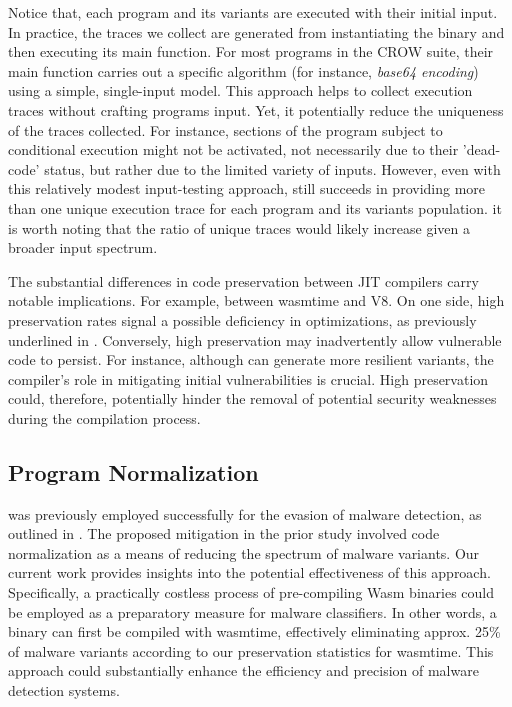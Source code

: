 Notice that, each program and its variants are executed with their initial input.
In practice, the traces we collect are generated from instantiating the \wasm binary and then executing its main function. 
For most programs in the CROW suite, their main function carries out a specific algorithm (for instance, \emph{base64 encoding}) using a simple, single-input model. 
This approach helps to collect execution traces without crafting programs input.
Yet, it potentially reduce the uniqueness of the traces collected. 
For instance, sections of the program subject to conditional execution might not be activated, not necessarily due to their 'dead-code' status, but rather due to the limited variety of inputs. 
However, even with this relatively modest input-testing approach, \tool still succeeds in providing more than one unique execution trace for each program and its variants population.
it is worth noting that the ratio of unique traces would likely increase given a broader input spectrum.


The substantial differences in code preservation between JIT compilers carry notable implications. 
For example, between wasmtime and V8.
On one side, high preservation rates signal a possible deficiency in optimizations, as previously underlined in \cite{wasmslim}. 
Conversely, high preservation may inadvertently allow vulnerable code to persist.
For instance, although \tool can generate more resilient variants, the compiler's role in mitigating initial vulnerabilities is crucial. 
High preservation could, therefore, potentially hinder the removal of potential security weaknesses during the compilation process.


\subsection{Program Normalization}
\tool was previously employed successfully for the evasion of malware detection, as outlined in \cite{CABRERAARTEAGA2023103296}. 
The proposed mitigation in the prior study involved code normalization as a means of reducing the spectrum of malware variants. 
Our current work provides insights into the potential effectiveness of this approach. 
Specifically, a practically costless process of pre-compiling Wasm binaries could be employed as a preparatory measure for malware classifiers. 
In other words, a \wasm binary can first be compiled with wasmtime, effectively eliminating approx. 25\% of malware variants according to our preservation statistics for wasmtime. 
This approach could substantially enhance the efficiency and precision of malware detection systems.
